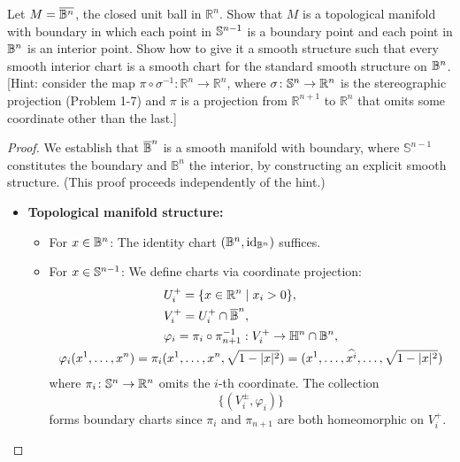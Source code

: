\begin{problem}
  Let $M = \overline{\mathbb{B}^n}$, the closed unit ball in $\mathbb{R}^n$. 
  Show that $M$ is a topological manifold with boundary in which each point in $\mathbb{S}^{n-1}$ is a boundary point and each point in $\mathbb{B}^n$ is an interior point. 
  Show how to give it a smooth structure such that every smooth interior chart is a smooth chart for the standard smooth structure on $\mathbb{B}^n$. [Hint: consider the map $\pi \circ\sigma^{-1}\colon \mathbb{R}^n\to\mathbb{R}^n$, 
  where $\sigma\colon \mathbb{S}^n\to\mathbb{R}^n$ is the stereographic projection (Problem 1-7) and $\pi$ is a projection from $\mathbb{R}^{n+1}$ to $\mathbb{R}^n$ that omits some coordinate other than the last.]
  \begin{proof}
    We establish that $\overline{\mathbb{B}}^n$ is a smooth manifold with boundary, where $\mathbb{S}^{n-1}$ constitutes the boundary and $\mathbb{B}^n$ the interior, by constructing an explicit smooth structure. (This proof proceeds independently of the hint.)
    \begin{itemize}
      \item \textbf{Topological manifold structure:}
      \begin{itemize}
        \item For $x \in \mathbb{B}^n$: The identity chart $(\mathbb{B}^n, \text{id}_{\mathbb{B}^n})$ suffices.
        \item For $x \in \mathbb{S}^{n-1}$: We define charts via coordinate projection:
        \begin{gather*}
          \begin{aligned}
            &U_i^+ = \{x \in \mathbb{R}^n \mid x_i > 0\}, \\
            &V_i^+ = U_i^+ \cap \overline{\mathbb{B}}^n, \\
            &\varphi_i = \pi_i \circ \pi_{n+1}^{-1}: V_i^+ \to \mathbb{H}^{n} \cap \mathbb{B}^n,
          \end{aligned}\\
          \varphi_i(x^1, \dots, x^n) = \pi_i(x^1, \dots, x^n, \sqrt{1-|x|^2}) = (x^1, \dots, \widehat{x^i}, \dots, \sqrt{1-|x|^2})
        \end{gather*}
        where $\pi_{i} \colon \mathbb{S}^n \to \mathbb{R}^n$  omits the $i$-th coordinate.
        The collection 
        \begin{equation*}
        \{(V_i^{\pm}, \varphi_i)\}
        \end{equation*}
        forms boundary charts since $\pi_i$ and $\pi_{n+1}$ are both homeomorphic on $V_i^+$.
      \end{itemize}

\end{itemize}
\end{proof}
\end{problem}
